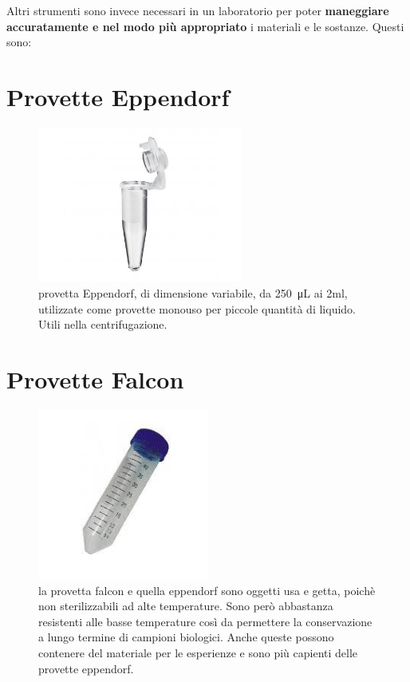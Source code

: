 \documentclass{report}
\begin{document}
	\vspace{0.5cm}

Altri strumenti sono invece necessari in un laboratorio per poter
\textbf{maneggiare accuratamente e nel modo più appropriato} i materiali
e le sostanze. Questi sono:
	\vspace{0.5cm}

	\section{Provette Eppendorf}

	\begin{figure}[H]

		\includegraphics[width=0.6\textwidth]{./immagini/eppendorf.jpg}
		\caption{provetta Eppendorf, di dimensione variabile, da \SI{250}{\micro\liter} ai 2ml,
		utilizzate come provette monouso per piccole quantità di liquido. Utili nella centrifugazione.}
		\label{eppendorf}

	\end{figure}

	\vspace{0.5cm}


	\section{Provette Falcon}

	\begin{figure}[H]

		\includegraphics[width=0.5\textwidth]{./immagini/falcon.jpeg}
		\caption{la provetta falcon e quella eppendorf sono oggetti usa e getta,
		poichè non sterilizzabili ad alte temperature.
		Sono però abbastanza resistenti alle basse temperature cos\`i da permettere
		la conservazione a lungo termine di campioni biologici.
		Anche queste possono contenere del materiale per le
		esperienze e sono più capienti delle provette eppendorf.}
		\label{falcon}

	\end{figure}
\end{document}
